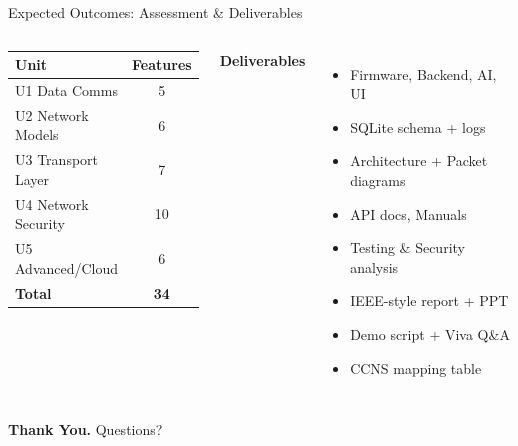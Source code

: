 \documentclass[aspectratio=169, 10pt]{beamer}
\begin{document}
\begin{frame}{Expected Outcomes: Assessment \& Deliverables}
  \begin{columns}[c, onlytextwidth]
      \begin{cvisbox}[title={CCNS Alignment}]
        \small
        \begin{tabular}{@{}lc@{}}
          \textbf{Unit} & \textbf{Features} \\
          \midrule
          U1 Data Comms       & 5  \\
          U2 Network Models   & 6  \\
          U3 Transport Layer  & 7  \\
          U4 Network Security & 10 \\
          U5 Advanced/Cloud   & 6  \\
          \midrule
          \textbf{Total}      & \textbf{34} \\
        \end{tabular}
      \end{cvisbox}

      \textbf{Deliverables}\\[6pt]
      \small
      \begin{itemize}\setlength\itemsep{4pt}
        \item Firmware, Backend, AI, UI
        \item SQLite schema + logs
        \item Architecture + Packet diagrams
        \item API docs, Manuals
        \item Testing \& Security analysis
        \item IEEE-style report + PPT
        \item Demo script + Viva Q\&A
        \item CCNS mapping table
      \end{itemize}
  \end{columns}

  \vspace{0.6cm}
  \begin{center}
    \Large\textbf{Thank You.} \quad \normalsize Questions?
  \end{center}
\end{frame}
\end{document}
